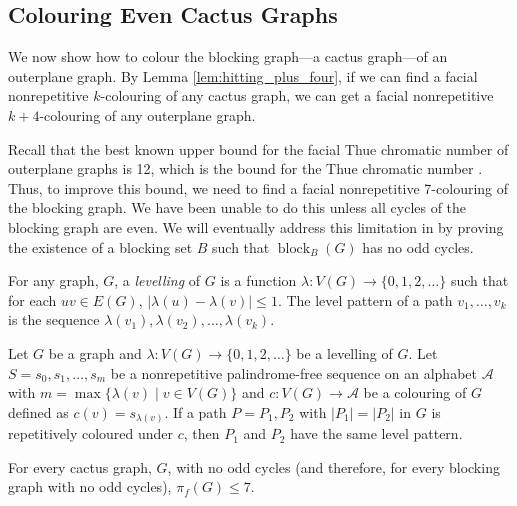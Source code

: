 \documentclass{patmorin}
\DeclareMathOperator{\block}{block}
\begin{document}
\subsection{Colouring Even Cactus Graphs}

We now show how to colour the blocking graph---a cactus graph---of an
outerplane graph.  By Lemma \ref{lem:hitting_plus_four}, if we can find
a facial nonrepetitive $k$-colouring of any cactus graph, we can get a
facial nonrepetitive $k+4$-colouring of any outerplane graph.

Recall that the best known upper bound for the facial Thue chromatic
number of outerplane graphs is 12, which is the bound for the Thue
chromatic number \cite{barat2007square, kundgen2008nonrepetitive}. Thus,
to improve this bound, we need to find a facial nonrepetitive 7-colouring
of the blocking graph. We have been unable to do this unless all cycles of
the blocking graph are even.  We will eventually address this limitation
in  by proving the existence of a blocking
set $B$ such that $\block_B(G)$ has no odd cycles.

For any graph, $G$, a \emph{levelling} of $G$ is a function
$\lambda\colon V(G)\to \{0, 1, 2,\dots\}$ such that for each
$uv\in E(G)$, $|\lambda(u)-\lambda(v)|\leq 1$. The
level pattern of a path $v_1,\ldots,v_k$ is the sequence
$\lambda(v_1),\lambda(v_2),\ldots,\lambda(v_k)$.

\begin{lem} 
 Let $G$ be a graph and $\lambda\colon V(G)\to \{0, 1,
 2,\dots\}$ be a levelling of $G$. Let $S=s_0,s_1,\ldots,s_m$
 be a nonrepetitive palindrome-free sequence on an alphabet
 $\mathcal{A}$ with $m=\max\{\lambda(v) \;|\; v \in V(G)\}$ and
 $c : V(G) \rightarrow \mathcal{A}$ be a colouring of $G$ defined
 as $c(v)=s_{\lambda(v)}$. If a path $P=P_1, P_2$ with
 $|P_1|=|P_2|$ in $G$ is repetitively coloured under $c$, then $P_1$
 and $P_2$ have the same level pattern.
\end{lem}

\begin{lem}
  For every cactus graph, $G$, with no odd cycles (and therefore, for
  every blocking graph with no odd cycles), $\pi_f(G)\le 7$.
\end{lem}
\end{document}
